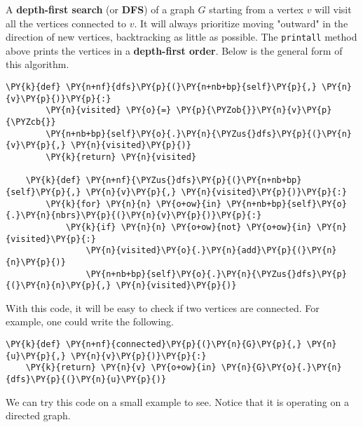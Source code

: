 A \textbf{depth-first search} (or \textbf{DFS}) of a graph $G$ starting from a vertex $v$ will visit all the vertices connected to $v$.
It will always prioritize moving "outward" in the direction of new vertices, backtracking as little as possible.
The \texttt{printall} method above prints the vertices in a \textbf{depth-first order}.
Below is the general form of this algorithm.

\begin{Verbatim}[commandchars=\\\{\}]
    \PY{k}{def} \PY{n+nf}{dfs}\PY{p}{(}\PY{n+nb+bp}{self}\PY{p}{,} \PY{n}{v}\PY{p}{)}\PY{p}{:}
        \PY{n}{visited} \PY{o}{=} \PY{p}{\PYZob{}}\PY{n}{v}\PY{p}{\PYZcb{}}
        \PY{n+nb+bp}{self}\PY{o}{.}\PY{n}{\PYZus{}dfs}\PY{p}{(}\PY{n}{v}\PY{p}{,} \PY{n}{visited}\PY{p}{)}
        \PY{k}{return} \PY{n}{visited}

    \PY{k}{def} \PY{n+nf}{\PYZus{}dfs}\PY{p}{(}\PY{n+nb+bp}{self}\PY{p}{,} \PY{n}{v}\PY{p}{,} \PY{n}{visited}\PY{p}{)}\PY{p}{:}
        \PY{k}{for} \PY{n}{n} \PY{o+ow}{in} \PY{n+nb+bp}{self}\PY{o}{.}\PY{n}{nbrs}\PY{p}{(}\PY{n}{v}\PY{p}{)}\PY{p}{:}
            \PY{k}{if} \PY{n}{n} \PY{o+ow}{not} \PY{o+ow}{in} \PY{n}{visited}\PY{p}{:}
                \PY{n}{visited}\PY{o}{.}\PY{n}{add}\PY{p}{(}\PY{n}{n}\PY{p}{)}
                \PY{n+nb+bp}{self}\PY{o}{.}\PY{n}{\PYZus{}dfs}\PY{p}{(}\PY{n}{n}\PY{p}{,} \PY{n}{visited}\PY{p}{)}
\end{Verbatim}



With this code, it will be easy to check if two vertices are connected.
For example, one could write the following.

\begin{Verbatim}[commandchars=\\\{\}]
\PY{k}{def} \PY{n+nf}{connected}\PY{p}{(}\PY{n}{G}\PY{p}{,} \PY{n}{u}\PY{p}{,} \PY{n}{v}\PY{p}{)}\PY{p}{:}
    \PY{k}{return} \PY{n}{v} \PY{o+ow}{in} \PY{n}{G}\PY{o}{.}\PY{n}{dfs}\PY{p}{(}\PY{n}{u}\PY{p}{)}
\end{Verbatim}



We can try this code on a small example to see.
Notice that it is operating on a directed graph.


